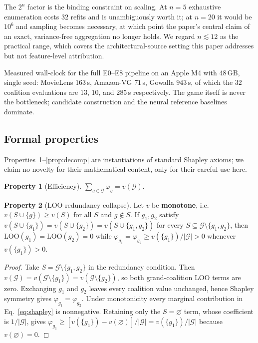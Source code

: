 \documentclass[pdflatex,sn-basic,Numbered]{sn-jnl}
\theoremstyle{plain}
\theoremstyle{definition}
\newtheorem{property}{Property}
\newcommand{\G}{\mathcal{G}}
\newcommand{\LOO}{\mathrm{LOO}}
\begin{document}
The $2^n$ factor is the binding constraint on scaling. At $n = 5$ exhaustive
enumeration costs $32$ refits and is unambiguously worth it; at $n = 20$ it
would be $10^6$ and sampling becomes necessary, at which point the paper's
central claim of an exact, variance-free aggregation no longer holds. We regard
$n \lesssim 12$ as the practical range, which covers the architectural-source
setting this paper addresses but not feature-level attribution.

Measured wall-clock for the full E0--E8 pipeline on an Apple M4 with 48\,GB,
single seed: MovieLens $163$\,s, Amazon-VG $71$\,s, Gowalla $943$\,s, of which
the $32$ coalition evaluations are $13$, $10$, and $285$\,s respectively. The
game itself is never the bottleneck; candidate construction and the neural
reference baselines dominate.

\subsection{Formal properties}\label{sec:theory}

Properties~\ref{prop:eff}--\ref{prop:decomp} are instantiations of standard
Shapley axioms; we claim no novelty for their mathematical content, only for
their careful use here.

\begin{property}[Efficiency]\label{prop:eff}
$\sum_{g \in \G} \varphi_g = v(\G)$.
\end{property}

\begin{property}[LOO redundancy collapse]\label{prop:loo}
Let $v$ be \textbf{monotone}, i.e.\ $v(S \cup \{g\}) \ge v(S)$ for all $S$ and
$g \notin S$. If $g_1, g_2$ satisfy
$v(S \cup \{g_1\}) = v(S \cup \{g_2\}) = v(S \cup \{g_1,g_2\})$ for every
$S \subseteq \G \setminus \{g_1,g_2\}$, then $\LOO(g_1) = \LOO(g_2) = 0$ while
$\varphi_{g_1} = \varphi_{g_2} \ge v(\{g_1\})/|\G| > 0$ whenever
$v(\{g_1\}) > 0$.
\end{property}

\begin{proof}
Take $S=\G\setminus\{g_1,g_2\}$ in the redundancy condition. Then
$v(\G)=v(\G\setminus\{g_1\})=v(\G\setminus\{g_2\})$, so both grand-coalition
LOO terms are zero. Exchanging $g_1$ and $g_2$ leaves every coalition value
unchanged, hence Shapley symmetry gives
$\varphi_{g_1}=\varphi_{g_2}$. Under monotonicity every marginal contribution
in Eq.~\eqref{eq:shapley} is nonnegative. Retaining only the
$S=\varnothing$ term, whose coefficient is $1/|\G|$, gives
$\varphi_{g_1}\ge[v(\{g_1\})-v(\varnothing)]/|\G|
=v(\{g_1\})/|\G|$ because $v(\varnothing)=0$.
\end{proof}
\end{document}

